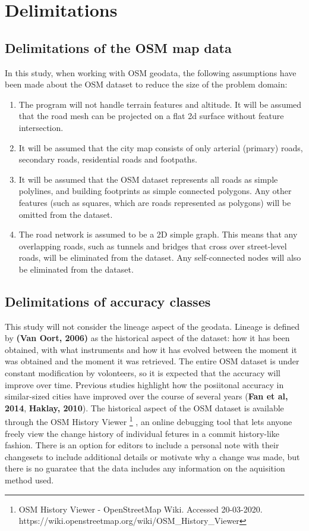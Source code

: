 \documentclass{kththesis}
\begin{document}
\section{Delimitations}

\subsection{Delimitations of the OSM map data}

In this study, when working with OSM geodata, the following assumptions have been made about the OSM dataset to reduce the size of the problem domain:

\begin{enumerate}
    \item The program will not handle terrain features and altitude. It will be assumed that the road mesh can be projected on a flat 2d surface without feature intersection.
    \item It will be assumed that the city map consists of only arterial (primary) roads, secondary roads, residential roads and footpaths.
    \item It will be assumed that the OSM dataset represents all roads as simple polylines, and building footprints as simple connected polygons. Any other features (such as squares, which are roads represented as polygons) will be omitted from the dataset.
    \item The road network is assumed to be a 2D simple graph. This means that any overlapping roads, such as tunnels and bridges that cross over street-level roads, will be eliminated from the dataset. Any self-connected nodes will also be eliminated from the dataset.
\end{enumerate}

\subsection{Delimitations of accuracy classes}

This study will not consider the lineage aspect of the geodata.
Lineage is defined by \textbf{(Van Oort, 2006)} as the historical aspect of the dataset: how it has been obtained, with what instruments and how it has evolved between the moment it was obtained and the moment it was retrieved.
The entire OSM dataset is under constant modification by volonteers, so it is expected that the accuracy will improve over time. Previous studies highlight how the posiitonal accuracy in similar-sized cities have improved over the course of several years (\textbf{Fan et al, 2014}, \textbf{Haklay, 2010}).
The historical aspect of the OSM dataset is available through the OSM History Viewer
\footnote{OSM History Viewer - OpenStreetMap Wiki. Accessed 20-03-2020. https://wiki.openstreetmap.org/wiki/OSM\_History\_Viewer}
, an online debugging tool that lets anyone freely view the change history of individual fetures in a commit history-like fashion.
There is an option for editors to include a personal note with their changesets to include additional details or motivate why a change was made, but there is no guaratee that the data includes any information on the aquisition method used.
\end{document}

